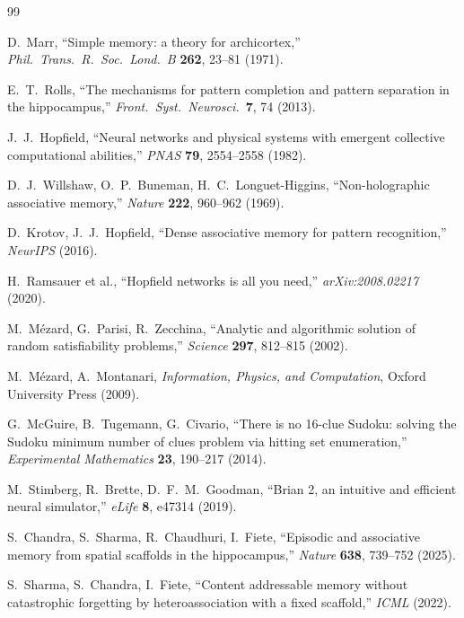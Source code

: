 \documentclass[11pt]{article}
\begin{document}

\begin{thebibliography}{99}

 D.~Marr, ``Simple memory: a theory for archicortex,''
\textit{Phil.\ Trans.\ R.\ Soc.\ Lond.\ B} \textbf{262}, 23--81 (1971).

 E.~T.~Rolls, ``The mechanisms for pattern completion and pattern
separation in the hippocampus,'' \textit{Front.\ Syst.\ Neurosci.}\ \textbf{7}, 74 (2013).

 J.~J.~Hopfield, ``Neural networks and physical systems with emergent
collective computational abilities,'' \textit{PNAS} \textbf{79}, 2554--2558 (1982).

 D.~J.~Willshaw, O.~P.~Buneman, H.~C.~Longuet-Higgins, ``Non-holographic
associative memory,'' \textit{Nature} \textbf{222}, 960--962 (1969).

 D.~Krotov, J.~J.~Hopfield, ``Dense associative memory for pattern
recognition,'' \textit{NeurIPS} (2016).

 H.~Ramsauer et al., ``Hopfield networks is all you need,''
\textit{arXiv:2008.02217} (2020).

 M.~M\'ezard, G.~Parisi, R.~Zecchina, ``Analytic and algorithmic solution
of random satisfiability problems,'' \textit{Science} \textbf{297}, 812--815 (2002).

 M.~M\'ezard, A.~Montanari, \textit{Information, Physics, and
Computation}, Oxford University Press (2009).

 G.~McGuire, B.~Tugemann, G.~Civario, ``There is no 16-clue Sudoku:
solving the Sudoku minimum number of clues problem via hitting set enumeration,''
\textit{Experimental Mathematics} \textbf{23}, 190--217 (2014).

 M.~Stimberg, R.~Brette, D.~F.~M.~Goodman, ``Brian 2, an intuitive and
efficient neural simulator,'' \textit{eLife} \textbf{8}, e47314 (2019).

 S.~Chandra, S.~Sharma, R.~Chaudhuri, I.~Fiete, ``Episodic and
associative memory from spatial scaffolds in the hippocampus,'' \textit{Nature} \textbf{638},
739--752 (2025).

 S.~Sharma, S.~Chandra, I.~Fiete, ``Content addressable memory without
catastrophic forgetting by heteroassociation with a fixed scaffold,'' \textit{ICML} (2022).


\end{thebibliography}
\end{document}
